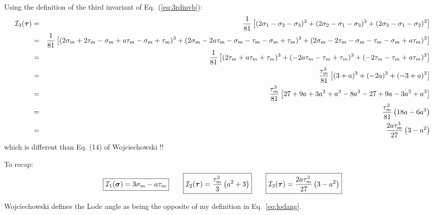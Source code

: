 Using the definition of the third invariant of Eq.~(\ref{eq:3rdinvb}):
\begin{eqnarray}
{\cal I}_3({\bm \tau}) 
&=& \frac{1}{81} \left[
(2\sigma_1-\sigma_2-\sigma_3)^3+
(2\sigma_2-\sigma_1-\sigma_3)^3+
(2\sigma_3-\sigma_1-\sigma_2)^3
\right] \nonumber\\
&=& \frac{1}{81} \left[
(2\sigma_m+2\tau_m-\sigma_m+a\tau_m-\sigma_m+\tau_m)^3+
(2\sigma_m-2a\tau_m-\sigma_m-\tau_m-\sigma_m+\tau_m)^3+
(2\sigma_m-2\tau_m-\sigma_m-\tau_m-\sigma_m+a\tau_m)^3
\right] \nonumber\\
&=& \frac{1}{81} \left[ (2\tau_m+a\tau_m+\tau_m)^3+ (-2a\tau_m-\tau_m+\tau_m)^3+ (-2\tau_m-\tau_m+a\tau_m)^3 \right] \nonumber\\
&=& \frac{\tau_m^3}{81} \left[ (3+a)^3+ (-2a)^3+ (-3+a)^3 \right] \nonumber\\
&=& \frac{\tau_m^3}{81} \left[ 27 +9a + 3a^2 + a^3  -8a^3 -27 +9a -3a^2 + a^3 \right] \nonumber\\
&=& \frac{\tau_m^3}{81} \left( 18a  -6 a^3  \right) \nonumber\\
&=& \frac{2a \tau_m^3}{27} \left( 3 - a^2  \right) 
\end{eqnarray}
which is different than Eq. (14) of  Wojciechowski \cite{wojc18}!!

To recap:
\begin{eqnarray}
\boxed{{\cal I}_1({\bm \sigma}) =  3\sigma_m -a\tau_m } 
\qquad
\boxed{{\cal I}_2({\bm \tau}) =\frac{\tau_m^2}{3}\left( a^2 +3 \right)}
\qquad
\boxed{{\cal I}_3({\bm \tau}) = \frac{2a \tau_m^3}{27} \left( 3 - a^2  \right) }
\end{eqnarray}

\begin{remark}
Wojciechowski \cite{wojc18} defines the Lode angle  
as being the opposite of my definition in Eq.~\ref{eq:lodang}.
\end{remark}

